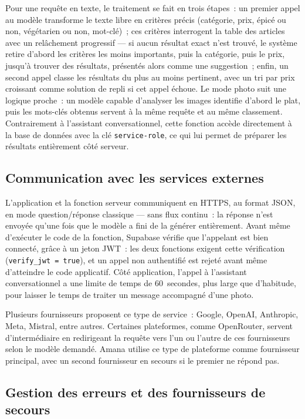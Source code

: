\documentclass[12pt,fleqn,a4paper]{report}
\begin{document}
\begin{justify}
Pour une requête en texte, le traitement se fait en trois étapes~: un premier appel au modèle transforme le texte libre en critères précis (catégorie, prix, épicé ou non, végétarien ou non, mot-clé)~; ces critères interrogent la table des articles avec un relâchement progressif — si aucun résultat exact n'est trouvé, le système retire d'abord les critères les moins importants, puis la catégorie, puis le prix, jusqu'à trouver des résultats, présentés alors comme une suggestion~; enfin, un second appel classe les résultats du plus au moins pertinent, avec un tri par prix croissant comme solution de repli si cet appel échoue. Le mode photo suit une logique proche~: un modèle capable d'analyser les images identifie d'abord le plat, puis les mots-clés obtenus servent à la même requête et au même classement. Contrairement à l'assistant conversationnel, cette fonction accède directement à la base de données avec la clé \texttt{service-role}, ce qui lui permet de préparer les résultats entièrement côté serveur.

\subsection{Communication avec les services externes}

L'application et la fonction serveur communiquent en HTTPS, au format JSON, en mode question/réponse classique — sans flux continu~: la réponse n'est envoyée qu'une fois que le modèle a fini de la générer entièrement. Avant même d'exécuter le code de la fonction, Supabase vérifie que l'appelant est bien connecté, grâce à un jeton JWT~: les deux fonctions exigent cette vérification (\texttt{verify\_jwt = true}), et un appel non authentifié est rejeté avant même d'atteindre le code applicatif. Côté application, l'appel à l'assistant conversationnel a une limite de temps de 60~secondes, plus large que d'habitude, pour laisser le temps de traiter un message accompagné d'une photo.

Plusieurs fournisseurs proposent ce type de service~: Google, OpenAI, Anthropic, Meta, Mistral, entre autres. Certaines plateformes, comme OpenRouter, servent d'intermédiaire en redirigeant la requête vers l'un ou l'autre de ces fournisseurs selon le modèle demandé. Amana utilise ce type de plateforme comme fournisseur principal, avec un second fournisseur en secours si le premier ne répond pas.

\subsection{Gestion des erreurs et des fournisseurs de secours}


\end{justify}
\end{document}

